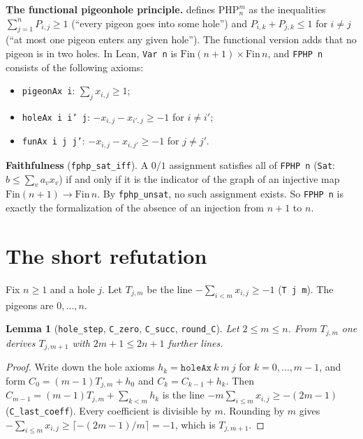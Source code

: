 \documentclass[11pt]{article}
\newtheorem{lemma}[theorem]{Lemma}
\theoremstyle{definition}
\begin{document}
\textbf{The functional pigeonhole principle.} \cite{DGGM} defines $\mathrm{PHP}^m_n$ as the inequalities
$\sum_{j=1}^n P_{i,j}\ge 1$ (``every pigeon goes into some hole'') and $P_{i,k}+P_{j,k}\le 1$ for $i\ne j$
(``at most one pigeon enters any given hole''). The functional version adds that no pigeon is in two
holes. In Lean, \texttt{Var n} is $\mathrm{Fin}(n+1)\times\mathrm{Fin}\,n$, and \texttt{FPHP n} consists of the
following axioms:
\begin{itemize}
\item \texttt{pigeonAx i}: $\sum_j x_{i,j}\ge 1$;
\item \texttt{holeAx i i' j}: $-x_{i,j}-x_{i',j}\ge -1$ for $i\ne i'$;
\item \texttt{funAx i j j'}: $-x_{i,j}-x_{i,j'}\ge -1$ for $j\ne j'$.
\end{itemize}
\textbf{Faithfulness} (\texttt{fphp\_sat\_iff}). A $0/1$ assignment satisfies all of \texttt{FPHP n}
(\texttt{Sat}: $b\le\sum_v a_vx_v$) if and only if it is the indicator of the graph of an injective map
$\mathrm{Fin}(n+1)\to\mathrm{Fin}\,n$. By \texttt{fphp\_unsat}, no such assignment exists. So \texttt{FPHP n} is
exactly the formalization of the absence of an injection from $n+1$ to $n$.

\section{The short refutation}

Fix $n\ge1$ and a hole $j$. Let $T_{j,m}$ be the line $-\sum_{i<m}x_{i,j}\ge -1$ (\texttt{T j m}). The
pigeons are $0,\dots,n$.

\begin{lemma}[\texttt{hole\_step}, \texttt{C\_zero}, \texttt{C\_succ}, \texttt{round\_C}]
Let $2\le m\le n$. From $T_{j,m}$ one derives $T_{j,m+1}$ with $2m+1\le 2n+1$ further lines.
\end{lemma}
\begin{proof}
Write down the hole axioms $h_k=\texttt{holeAx}\ k\ m\ j$ for $k=0,\dots,m-1$, and form
$C_0=(m-1)T_{j,m}+h_0$ and $C_k=C_{k-1}+h_k$. Then
$C_{m-1}=(m-1)T_{j,m}+\sum_{k<m}h_k$ is the line $-m\sum_{i\le m}x_{i,j}\ge -(2m-1)$
(\texttt{C\_last\_coeff}). Every coefficient is divisible by $m$. Rounding by $m$ gives
$-\sum_{i\le m}x_{i,j}\ge\lceil-(2m-1)/m\rceil=-1$, which is $T_{j,m+1}$.
\end{proof}
\end{document}
